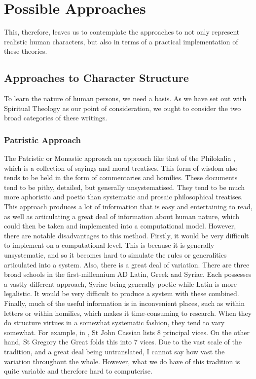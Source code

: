 \documentclass[11pt]{article}
\begin{document}
\section{Possible Approaches}
This, therefore, leaves us to contemplate the approaches to not only represent realistic human characters, but also in terms of a practical implementation of these theories. 
\subsection{Approaches to Character Structure}
To learn the nature of human persons, we need a basis. As we have set out with Spiritual Theology as our point of consideration, we ought to consider the two broad categories of these writings.
\subsubsection{Patristic Approach}
The Patristic or Monastic approach an approach like that of the Philokalia \cite{1983philokalia}, which is a collection of sayings and moral treatises. This form of wisdom also tends to be held in the form of commentaries and homilies. These documents tend to be pithy, detailed, but generally unsystematised. They tend to be much more aphoristic and poetic than systematic and prosaic philosophical treatises. This approach produces a lot of information that is easy and entertaining to read, as well as articulating a great deal of information about human nature, which could then be taken and implemented into a computational model. However, there are notable disadvantages to this method. Firstly, it would be very difficult to implement on a computational level. This is because it is generally unsystematic, and so it becomes hard to simulate the rules or generalities articulated into a system. Also, there is a great deal of variation. There are three broad schools in the first-millennium AD \: Latin, Greek and Syriac. Each possesses a vastly different approach, Syriac being generally poetic while Latin is more legalistic. It would be very difficult to produce a system with these combined. Finally, much of the useful information is in inconvenient places, such as within letters or within homilies, which makes it time-consuming to research. When they do structure virtues in a somewhat systematic fashion, they tend to vary somewhat. For example, in \cite{1983philokalia}, St John Cassian lists 8 principal vices. On the other hand, St Gregory the Great folds this into 7 vices. Due to the vast scale of the tradition, and a great deal being untranslated, I cannot say how vast the variation throughout the whole. However, what we do have of this tradition is quite variable and therefore hard to computerise. \\
\end{document}
